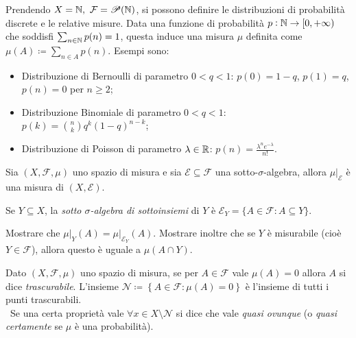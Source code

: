 \begin{example}
	Prendendo $X=\mathbb{N},\ \mathcal{F} =\mathscr{P}(\mathbb{N})$, si possono definire le distribuzioni di probabilità discrete e le relative misure. Data una funzione di probabilità $p: \mathbb{N} \rightarrow [0,+\infty)$ che soddisfi $\sum_{n\in\mathbb{N}} p(n)=1$, questa induce una misura $\mu$ definita come $\mu(A)\coloneqq\sum_{n\in A} p(n)$. Esempi sono:
	\begin{itemize}
	\item Distribuzione di Bernoulli di parametro $0<q<1$: $p(0)=1-q$, $p(1)=q$, $p(n)=0$ per $n\geq 2$;
	\item Distribuzione Binomiale di parametro $0<q<1$: $\displaystyle p(k)=\binom{n}{k} q^k (1-q)^{n-k}$;
	\item Distribuzione di Poisson di parametro $\lambda\in\mathbb{R}$: $\displaystyle p(n)=\frac{\lambda^ne^{-\lambda}}{n!}$.
	\end{itemize}
\end{example}

\begin{proposition}
	Sia $(X,\mathcal{F}, \mu)$ uno spazio di misura e sia $\mathcal{E} \subseteq \mathcal{F}$ una sotto-$\sigma$-algebra, allora $\mu\lvert_{\mathcal{E}}$ è una misura di $(X,\mathcal{E})$.
\end{proposition}

\begin{definition}
	Se $Y\subseteq X$, la \emph{sotto $\sigma$-algebra di sottoinsiemi} di $Y$ è $\mathcal{E}_Y=\{A\in \mathcal{F} : A \subseteq Y\}$.
\end{definition}

\begin{exercise}
	Mostrare che $\mu\lvert_{Y}(A)=\mu\lvert_{\mathcal{E}_Y}(A)$. Mostrare inoltre che se $Y$ è misurabile (cioè $Y\in \mathcal{F}$), allora questo è uguale a $\mu(A\cap Y)$.
\end{exercise}

\begin{definition}
	Dato $(X,\mathcal{F}, \mu)$ uno spazio di misura, se per $A\in \mathcal{F}$ vale $\mu(A)=0$ allora $A$ si dice \emph{trascurabile}. L'insieme $\mathscr{N}\coloneqq\left\{A\in \mathcal{F} : \mu(A)=0 \right\}$ è l'insieme di tutti i punti trascurabili. \\\
    Se una certa proprietà vale $\forall x \in X \setminus \mathscr{N}$ si dice che vale \emph{quasi ovunque} (o \emph{quasi certamente} se $ \mu $ è una probabilità).
\end{definition}

